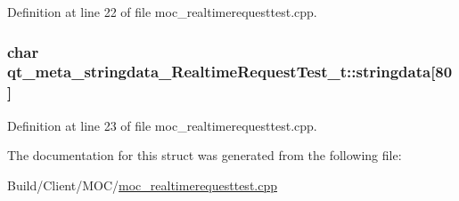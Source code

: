Definition at line 22 of file moc\+\_\+realtimerequesttest.\+cpp.

\hypertarget{structqt__meta__stringdata___realtime_request_test__t_a75f77696c722584a4fc1f4b589a7be05}{}
\subsubsection[{stringdata}]{\setlength{\rightskip}{0pt plus 5cm}char qt\+\_\+meta\+\_\+stringdata\+\_\+\+Realtime\+Request\+Test\+\_\+t\+::stringdata\mbox{[}80\mbox{]}}\label{structqt__meta__stringdata___realtime_request_test__t_a75f77696c722584a4fc1f4b589a7be05}


Definition at line 23 of file moc\+\_\+realtimerequesttest.\+cpp.



The documentation for this struct was generated from the following file\+:\begin{DoxyCompactItemize}
\item 
Build/\+Client/\+M\+O\+C/\hyperlink{moc__realtimerequesttest_8cpp}{moc\+\_\+realtimerequesttest.\+cpp}\end{DoxyCompactItemize}
